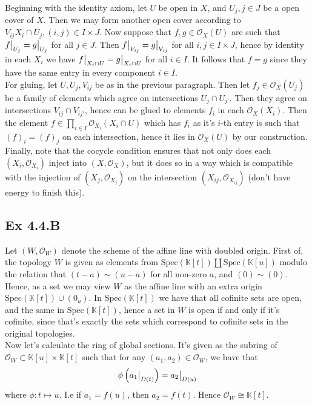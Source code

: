 \documentclass{article}
\newcommand\restr[2]{{%
  \left.\kern-\nulldelimiterspace %
  #1 %
  \vphantom{\big|} %
  \right|_{#2} %
  }}
\theoremstyle{definition}
\newcommand{\K}{\mathbb{K}}
\newcommand{\oo}{\mathcal{O}}
\newcommand{\Spec}{\text{Spec}}
\begin{document}
Beginning with the identity axiom, let $U$ be open in $X$, and $U_j, j \in J$
be a open cover of $X$. Then we may form another open cover according to
$V_{ij} X_i \cap U_j, (i, j) \in I \times J$. Now suppose that $f, g \in
\mathcal{O}_{X}(U)$ are such that $\restr{f}{U_j} = \restr{g}{U_j}$ for all $j
\in J$. Then $\restr{f}{V_{ij}} = \restr{g}{V_{ij}}$ for all $i,j \in I \times
J$, hence by identity in each $X_i$ we have $\restr{f}{X_i \cap U} =
\restr{g}{X_i \cap U}$ for all $i \in I$. It follows that $f = g$ since they
have the same entry in every component $i \in I$. \\

For gluing, let $U, U_j, V_{ij}$ be as in the previous paragraph. Then let $f_j
\in \mathcal{O}_X(U_j)$ be a family of elements which agree on intersections
$U_j \cap U_{j'}$. Then they agree on intersections $V_{ij} \cap V_{ij'}$,
hence can be glued to elements $f_i$ in each $\mathcal{O}_X(X_i)$. Then the
element $f \in \prod_{i \in I} \oo_{X_i}(X_i \cap U)$ which has $f_i$ as it's
$i$-th entry is such that $(f)_i = (f)_j$ on each intersection, hence it lies
in $\mathcal{O}_{X}(U)$ by our construction. \\

Finally, note that the cocycle condition ensures that not only does each $(X_i,
\oo_{X_i})$ inject into $(X, \oo_X)$, but it does so in a way which is
compatible with the injection of $(X_j, \oo_{X_j})$ on the intersection
$(X_{ij}, \oo_{X_{ij}})$ (don't have energy to finish this). 


\subsection*{Ex 4.4.B}

Let $(W, \oo_W)$ denote the scheme of the affine line with doubled origin.
First of, the topology $W$ is given as elements from $\Spec(\K[t]) \coprod
\Spec(\K[u])$ modulo the relation that $(t - a) \sim (u - a)$ for all non-zero
$a$, and $(0) \sim (0)$. Hence, as a set we may view $W$ as the affine line
with an extra origin $\Spec(\K[t]) \cup (0_u)$. In $\Spec(\K[t])$ we have that
all cofinite sets are open, and the same in $\Spec(\K[t])$, hence a set in $W$
is open if and only if it's cofinite, since that's exactly the sets which
correspond to cofinite sets in the original topologies. \\

Now let's calculate the ring of global sections. It's given as the subring of
$\oo_W \subset \K[u] \times \K[t]$ such that for any $(a_1, a_2) \in
\oo_W$, we have that 
\[
	\phi\left(\restr{a_1}{D(t)}\right)
	=
	\restr{a_2}{D(u)}
\] 
where $\phi : t \mapsto u$. I.e if $a_1 = f(u)$, then $a_2 = f(t)$. Hence
$\oo_W \cong \K[t]$. \\
\end{document}
